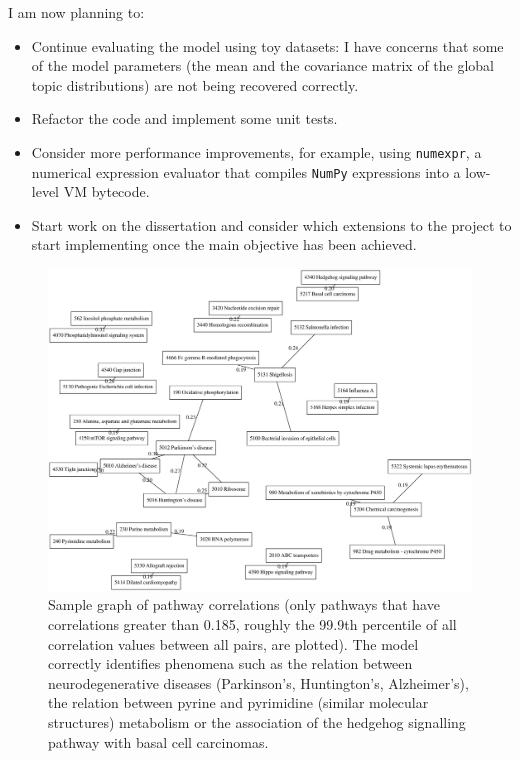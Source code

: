 \documentclass[12pt,a4]{article}
\begin{document}
I am now planning to:

\begin{itemize}
\item Continue evaluating the model using toy datasets: I have concerns that some of the model parameters (the mean and the covariance matrix of the global topic distributions) are not being recovered correctly.
\item Refactor the code and implement some unit tests.
\item Consider more performance improvements, for example, using \texttt{numexpr}, a numerical expression evaluator that compiles \texttt{NumPy} expressions into a low-level VM bytecode.
\item Start work on the dissertation and consider which extensions to the project to start implementing once the main objective has been achieved.
\end{itemize}

\begin{figure}[!htb]
\includegraphics[width=\textwidth]{progress-report-pathways.eps}
\caption{Sample graph of pathway correlations (only pathways that have correlations greater than 0.185, roughly the 99.9th percentile of all correlation values between all pairs, are plotted). The model correctly identifies phenomena such as the relation between neurodegenerative diseases (Parkinson's, Huntington's, Alzheimer's), the relation between pyrine and pyrimidine (similar molecular structures) metabolism or the association of the hedgehog signalling pathway with basal cell carcinomas.}
\end{figure}
\end{document}
